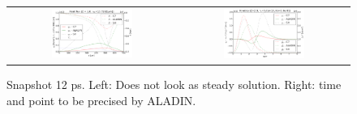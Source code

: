 \documentclass[preprint,12pt]{elsarticle}
\newcommand{\figscale}{0.5}
\begin{document}
\begin{figure}[tbh]
  \begin{center}
    \begin{tabular}{cc}
      \includegraphics[width=\figscale\textwidth]{../VFPdata/C7_Aladin_case2_heatflux.png} &
      \includegraphics[width=\figscale\textwidth]{../VFPdata/C7_Aladin_case2_kinetics.png}
    \end{tabular}
  \caption{  
  Snapshot 12 ps. Left: Does not look as steady solution. Right: time and point to be precised by ALADIN.
  }
  \end{center}
  \label{fig:C7_ALADIN_case2}
\end{figure}
\end{document}
